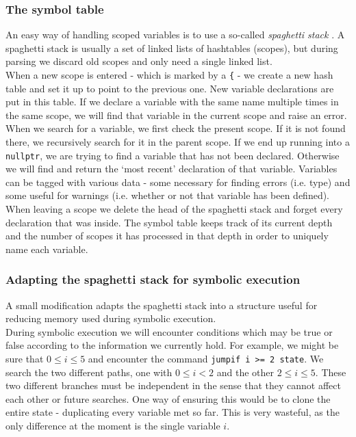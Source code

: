 \documentclass[12pt,a4paper]{article}
\begin{document}
\subsubsection{The symbol table}
An easy way of handling scoped variables is to use a so-called \textit{spaghetti stack} \citep{dragon}. A spaghetti stack is usually a set of linked lists of hashtables (scopes), but during parsing we discard old scopes and only need a single linked list.\\
When a new scope is entered - which is marked by a \texttt{\{} - we create a new hash table and set it up to point to the previous one. New variable declarations are put in this table. If we declare a variable with the same name multiple times in the same scope, we will find that variable in the current scope and raise an error.\\
When we search for a variable, we first check the present scope. If it is not found there, we recursively search for it in the parent scope. If we end up running into a \texttt{nullptr}, we are trying to find a variable that has not been declared. Otherwise we will find and return the `most recent' declaration of that variable. Variables can be tagged with various data - some necessary for finding errors (i.e. type) and some useful for warnings (i.e. whether or not that variable has been defined).\\
When leaving a scope we delete the head of the spaghetti stack and forget every declaration that was inside. The symbol table keeps track of its current depth and the number of scopes it has processed in that depth in order to uniquely name each variable.

\subsubsection{Adapting the spaghetti stack for symbolic execution}
A small modification adapts the spaghetti stack into a structure useful for reducing memory used during symbolic execution.\\
During symbolic execution we will encounter conditions which may be true or false according to the information we currently hold. For example, we might be sure that $0 \leq i \leq 5$ and encounter the command \texttt{jumpif i >= 2 state}. We search the two different paths, one with $0 \leq i < 2$ and the other $2 \leq i \leq 5$. These two different branches must be independent in the sense that they cannot affect each other or future searches. One way of ensuring this would be to clone the entire state - duplicating every variable met so far. This is very wasteful, as the only difference at the moment is the single variable $i$.\par
\end{document}
